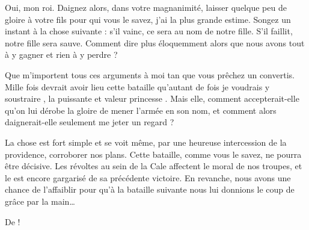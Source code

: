 \begin{drama}
  \reinespeaks Oui, mon roi.
  Daignez alors, dans votre magnanimité, laisser quelque peu de gloire à votre fils \elena{} pour qui vous le savez, j’ai la plus grande estime. Songez un instant à la chose suivante : s’il vainc, ce sera au nom de notre fille. S’il faillit, notre fille sera sauve. Comment dire plus éloquemment alors que nous avons tout à y gagner et rien à y perdre ?

  \roispeaks Que m’importent tous ces arguments à moi tan que vous prêchez un convertis. Mille fois devrait avoir lieu cette bataille qu’autant de fois je voudrais y soustraire \princesse, la puissante et valeur princesse \princesse. Mais elle, comment accepterait-elle qu’on lui dérobe la gloire de mener l’armée en son nom, et comment alors daignerait-elle seulement me jeter un regard ?

  \reinespeaks La chose est fort simple et se voit même, par une heureuse intercession de la providence, corroborer nos plans. Cette bataille, comme vous le savez, ne pourra être décisive. Les révoltes au sein de la Cale affectent le moral de nos troupes, et le \campoppose{} est encore gargarisé de sa précédente victoire. En revanche, nous avons une chance de l’affaiblir pour qu’à la bataille suivante nous lui donnions le coup de grâce par la main…

  \roispeaks De \princesse !
\end{drama}

\scene




\nopagebreak

